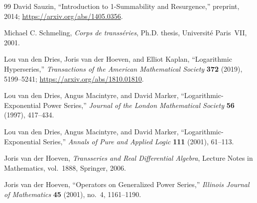 \documentclass[11pt,oneside]{book}
\theoremstyle{definition}
\theoremstyle{remark}
\begin{document}
{\begin{thebibliography}{99}
David Sauzin,
``Introduction to 1-Summability and Resurgence,'' preprint, 2014;
\url{https://arxiv.org/abs/1405.0356}.

Michael C. Schmeling,
\emph{Corps de transs\'eries}, Ph.D. thesis, Universit\'e Paris~VII, 2001.

Lou van den Dries, Joris van der Hoeven, and Elliot Kaplan,
``Logarithmic Hyperseries,''
\emph{Transactions of the American Mathematical Society}
\textbf{372} (2019), 5199--5241;
\url{https://arxiv.org/abs/1810.01810}.

Lou van den Dries, Angus Macintyre, and David Marker,
``Logarithmic-Exponential Power Series,''
\emph{Journal of the London Mathematical Society}
\textbf{56} (1997), 417--434.

Lou van den Dries, Angus Macintyre, and David Marker,
``Logarithmic-Exponential Series,''
\emph{Annals of Pure and Applied Logic}
\textbf{111} (2001), 61--113.

Joris van der Hoeven,
\emph{Transseries and Real Differential Algebra},
Lecture Notes in Mathematics, vol.~1888, Springer, 2006.

Joris van der Hoeven,
``Operators on Generalized Power Series,''
\emph{Illinois Journal of Mathematics} \textbf{45} (2001), no.~4,
1161--1190.

\end{thebibliography}
}
\end{document}
